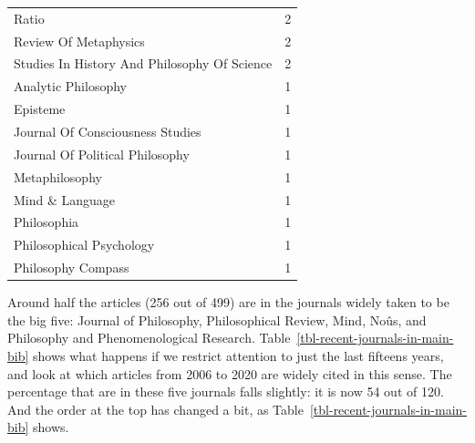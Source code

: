 \documentclass[
  10pt,
  letterpaper,
  DIV=11,
  numbers=noendperiod,
  twoside]{scrartcl}
\begin{document}
\begin{longtable}[]{@{}lr@{}}
Ratio & 2 \\
Review Of Metaphysics & 2 \\
Studies In History And Philosophy Of Science & 2 \\
Analytic Philosophy & 1 \\
Episteme & 1 \\
Journal Of Consciousness Studies & 1 \\
Journal Of Political Philosophy & 1 \\
Metaphilosophy & 1 \\
Mind \& Language & 1 \\
Philosophia & 1 \\
Philosophical Psychology & 1 \\
Philosophy Compass & 1 \\

\end{longtable}

Around half the articles (256 out of 499) are in the journals widely
taken to be the big five: Journal of Philosophy, Philosophical Review,
Mind, Noûs, and Philosophy and Phenomenological Research.
Table~\ref{tbl-recent-journals-in-main-bib} shows what happens if we
restrict attention to just the last fifteens years, and look at which
articles from 2006 to 2020 are widely cited in this sense. The
percentage that are in these five journals falls slightly: it is now 54
out of 120. And the order at the top has changed a bit, as
Table~\ref{tbl-recent-journals-in-main-bib} shows.
\end{document}
